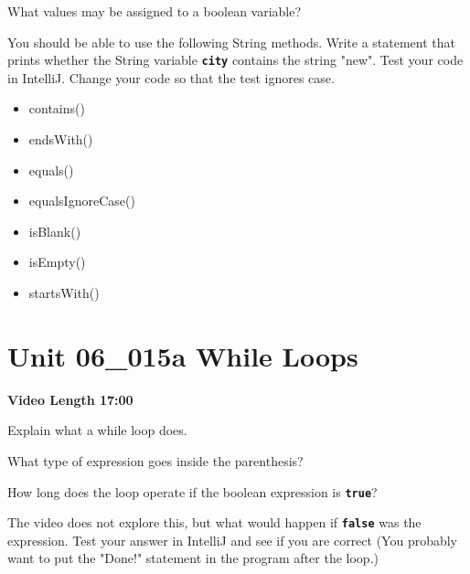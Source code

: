 \documentclass[letterpaper,12pt]{exam}
\newcommand{\unit}{Unit 06}
\begin{document}
\begin{questions}
\begin{samepage}
    \question What values may be assigned to a boolean variable?
    \vspace{5mm}
\end{samepage}

\begin{samepage}
    \question You should be able to use the following String methods.  
    \vspace{5mm}  Write a statement that prints whether the String variable \texttt{\textbf{city}} contains the string "new".  Test your code in IntelliJ.  Change your code so that the test ignores case.

\begin{itemize}
    \item contains()
    \item endsWith()
    \item equals()
    \item equalsIgnoreCase()
    \item isBlank()
    \item isEmpty()
    \item startsWith()
\end{itemize}
\end{samepage}

\section*{\unit\_015a While Loops} %
\noindent \textbf{Video Length 17:00}

\begin{samepage}
    \question Explain what a while loop does.
    \vspace{5mm}
\end{samepage}

\begin{samepage}
    \question What type of expression goes inside the parenthesis?
    \vspace{5mm}
\end{samepage}

\begin{samepage}
    \question How long does the loop operate if the boolean expression is \texttt{\textbf{true}}?
    \vspace{5mm}
\end{samepage}

\begin{samepage}
    \question The video does not explore this, but what would happen if \texttt{\textbf{false}} was the expression.  Test your answer in IntelliJ and see if you are correct (You probably want to put the "Done!" statement in the program after the loop.)
    \vspace{5mm}
\end{samepage}


\end{questions}
\end{document}
